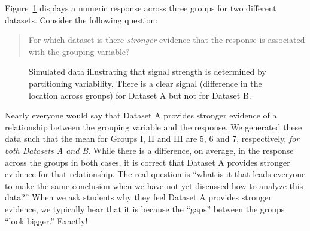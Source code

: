 \documentclass[
  letterpaper,
  DIV=11,
  numbers=noendperiod]{scrreprt}
\theoremstyle{definition}
\theoremstyle{definition}
\theoremstyle{plain}
\theoremstyle{remark}
\begin{document}
Figure~\ref{fig-anovateststat-boxplots} displays a numeric response
across three groups for two different datasets. Consider the following
question:

\begin{quote}
For which dataset is there \emph{stronger} evidence that the response is
associated with the grouping variable?
\end{quote}

\begin{figure}


\caption{\label{fig-anovateststat-boxplots}Simulated data illustrating
that signal strength is determined by partitioning variability. There is
a clear signal (difference in the location across groups) for Dataset A
but not for Dataset B.}

\end{figure}%

Nearly everyone would say that Dataset A provides stronger evidence of a
relationship between the grouping variable and the response. We
generated these data such that the mean for Groups I, II and III are 5,
6 and 7, respectively, \emph{for both Datasets A and B}. While there is
a difference, on average, in the response across the groups in both
cases, it is correct that Dataset A provides stronger evidence for that
relationship. The real question is ``what is it that leads everyone to
make the same conclusion when we have not yet discussed how to analyze
this data?'' When we ask students why they feel Dataset A provides
stronger evidence, we typically hear that it is because the ``gaps''
between the groups ``look bigger.'' Exactly!
\end{document}
